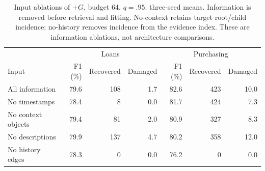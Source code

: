 \begin{table}[t]
\centering\small
\caption{Input ablations of $+G$, budget 64, $q=.95$: three-seed means. Information is removed before retrieval and fitting. No-context retains target root/child incidence; no-history removes incidence from the evidence index. These are information ablations, not architecture comparisons.}
\label{tab:followup-ablation}
\begin{tabular}{l rrr rrr}
\toprule
 & \multicolumn{3}{c}{Loans} & \multicolumn{3}{c}{Purchasing} \\
Input & F1 (\%) & Recovered & Damaged & F1 (\%) & Recovered & Damaged \\ \midrule
All information & 79.6 & 108 & 1.7 & 82.6 & 423 & 10.0 \\
No timestamps & 78.4 & 8 & 0.0 & 81.7 & 424 & 7.3 \\
No context objects & 79.4 & 81 & 2.0 & 80.9 & 327 & 8.3 \\
No descriptions & 79.9 & 137 & 4.7 & 80.2 & 358 & 12.0 \\
No history edges & 78.3 & 0 & 0.0 & 76.2 & 0 & 0.0 \\
\bottomrule
\end{tabular}
\end{table}
